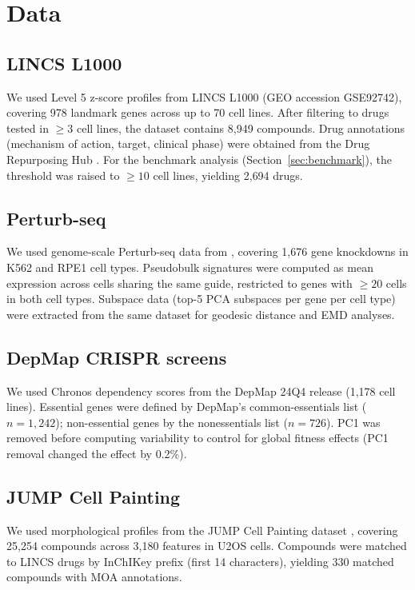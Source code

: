\documentclass[11pt]{article}
\begin{document}
\section{Data}

\subsection{LINCS L1000}

We used Level 5 z-score profiles from LINCS L1000
\citep{subramanian2017next} (GEO accession GSE92742), covering 978
landmark genes across up to 70 cell lines. After filtering to drugs
tested in $\geq 3$ cell lines, the dataset contains 8{,}949 compounds.
Drug annotations (mechanism of action, target, clinical phase) were
obtained from the Drug Repurposing Hub \citep{corsello2017drug}. For the
benchmark analysis (Section~\ref{sec:benchmark}), the threshold was
raised to $\geq 10$ cell lines, yielding 2{,}694 drugs.

\subsection{Perturb-seq}

We used genome-scale Perturb-seq data from \citet{replogle2022mapping},
covering 1{,}676 gene knockdowns in K562 and RPE1 cell types. Pseudobulk
signatures were computed as mean expression across cells sharing the same
guide, restricted to genes with $\geq 20$ cells in both cell types.
Subspace data (top-5 PCA subspaces per gene per cell type) were extracted
from the same dataset for geodesic distance and EMD analyses.

\subsection{DepMap CRISPR screens}

We used Chronos dependency scores from the DepMap 24Q4 release (1{,}178
cell lines). Essential genes were defined by DepMap's common-essentials
list ($n = 1{,}242$); non-essential genes by the nonessentials list
($n = 726$). PC1 was removed before computing variability to control for
global fitness effects (PC1 removal changed the effect by 0.2\%).

\subsection{JUMP Cell Painting}

We used morphological profiles from the JUMP Cell Painting dataset
\citep{chandrasekaran2023jump}, covering 25{,}254 compounds across
3{,}180 features in U2OS cells. Compounds were matched to LINCS drugs by
InChIKey prefix (first 14 characters), yielding 330 matched compounds
with MOA annotations.
\end{document}
